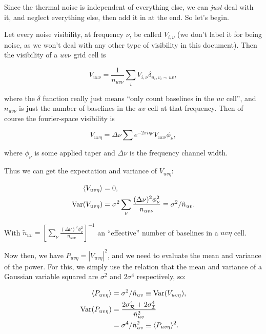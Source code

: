 \documentclass[11pt]{article}
\begin{document}
    Since the thermal noise is independent of everything else, we can
\emph{just} deal with it, and neglect everything else, then add it in at
the end. So let's begin.

Let every noise visibility, at frequency \(\nu\), be called
\(V_{i,\nu}\) (we don't label it for being noise, as we won't deal with
any other type of visibility in this document). Then the visibility of a
\(uv\nu\) grid cell is

\begin{equation}
    V_{uv\nu} = \frac{1}{n_{uv\nu}}\sum_i V_{i,\nu} \delta_{u_i,v_i \sim uv},
\end{equation}

where the \(\delta\) function really just means ``only count baselines
in the \(uv\) cell'', and \(n_{uv\nu}\) is just the number of baselines
in the \(uv\) cell at that frequency. Then of course the fourier-space
visibility is

\begin{equation}
    V_{uv\eta} = \Delta\nu \sum e^{-2\pi i \eta \nu} V_{uv\nu} \phi_\nu,
\end{equation}

where \(\phi_\nu\) is some applied taper and \(\Delta\nu\) is the
frequency channel width.

Thus we can get the expectation and variance of \(V_{uv\eta}\):

\begin{align}
    \langle V_{uv\eta} \rangle &= 0, \\
    {\rm Var}(V_{uv\eta}) &= \sigma^2 \sum_\nu \frac{(\Delta\nu)^2 \phi_\nu^2}{n_{uv\nu}} \equiv \sigma^2 / \tilde{n}_{uv}.
\end{align}

With
\(\tilde{n}_{uv} = \left[\sum_\nu \frac{(\Delta\nu)^2 \phi_\nu^2}{n_{uv\nu}}\right]^{-1}\)
an ``effective'' number of baselines in a \(uv\eta\) cell.

    Now then, we have \(P_{uv\eta} = |V_{uv\eta}|^2\), and we need to
evaluate the mean and variance of the power. For this, we simply use the
relation that the mean and variance of a Gaussian variable squared are
\(\sigma^2\) and \(2\sigma^4\) respectively, so:

\begin{align}
    \langle P_{uv\eta} \rangle &= \sigma^2 / \tilde{n}_{uv} \equiv {\rm Var}(V_{uv\eta}), \\
    {\rm Var}(P_{uv\eta}) &= \frac{2 \sigma^4_\mathcal{R} + 2\sigma^4_{\mathcal{I}}}{\tilde{n}^2_{uv}} \\
    &= \sigma^4 / \tilde{n}^2_{uv} \equiv \langle P_{uv\eta} \rangle ^2.
\end{align}
\end{document}
